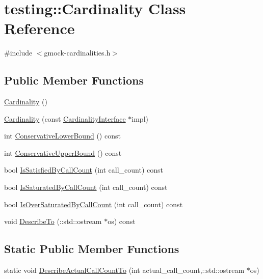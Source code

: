 \hypertarget{classtesting_1_1_cardinality}{}\section{testing\+:\+:Cardinality Class Reference}
\label{classtesting_1_1_cardinality}


{\ttfamily \#include $<$gmock-\/cardinalities.\+h$>$}

\subsection*{Public Member Functions}
\begin{DoxyCompactItemize}
\item 
\hyperlink{classtesting_1_1_cardinality_ab4b4066d7f5e9e3c7f851e49ab892cd9}{Cardinality} ()
\item 
\hyperlink{classtesting_1_1_cardinality_a10aed768b8a22d27110587444733771f}{Cardinality} (const \hyperlink{classtesting_1_1_cardinality_interface}{Cardinality\+Interface} $\ast$impl)
\item 
int \hyperlink{classtesting_1_1_cardinality_a7888bbbd2890b79671aecff37e94ef1d}{Conservative\+Lower\+Bound} () const 
\item 
int \hyperlink{classtesting_1_1_cardinality_a45a6f7b06ddaa645b9eb9b11ed84d732}{Conservative\+Upper\+Bound} () const 
\item 
bool \hyperlink{classtesting_1_1_cardinality_a8e43e216d44f98df7bc8dbce0a6057eb}{Is\+Satisfied\+By\+Call\+Count} (int call\+\_\+count) const 
\item 
bool \hyperlink{classtesting_1_1_cardinality_a3bafb8d0eea9b5884f685aa3fb24b33e}{Is\+Saturated\+By\+Call\+Count} (int call\+\_\+count) const 
\item 
bool \hyperlink{classtesting_1_1_cardinality_aba165c12fb9c48d03a18d4181d6d31f5}{Is\+Over\+Saturated\+By\+Call\+Count} (int call\+\_\+count) const 
\item 
void \hyperlink{classtesting_1_1_cardinality_aa111bb7e1eeb04849ede2166c5017893}{Describe\+To} (\+::std\+::ostream $\ast$os) const 
\end{DoxyCompactItemize}
\subsection*{Static Public Member Functions}
\begin{DoxyCompactItemize}
\item 
static void \hyperlink{classtesting_1_1_cardinality_aff07a924fe727a0ba82c5993c7d0883c}{Describe\+Actual\+Call\+Count\+To} (int actual\+\_\+call\+\_\+count,\+::std\+::ostream $\ast$os)
\end{DoxyCompactItemize}


